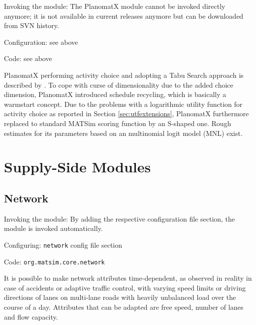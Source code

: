 
{\color{lightgray}\tiny

\begin{compactitem}
\item Invoking the module: The PlanomatX module cannot be invoked directly anymore; it is not available in current releases anymore but can be downloaded from SVN history.
\item Configuration: see above
\item Code: see above
\end{compactitem}

PlanomatX performing activity choice and adopting a Tabu Search approach is described by \citet[][]{Feil_PhDThesis_2010}. To cope with curse of dimensionality due to the added choice dimension, PlanomatX introduced schedule recycling, which is basically a warmstart concept. Due to the problems with a logarithmic utility function for activity choice as reported in Section \ref{sec:utfextensions}, PlanomatX furthermore replaced to standard MATSim scoring function by an S-shaped one. Rough estimates for its parameters based on an multinomial logit model (MNL) exist.
}

\section{Supply-Side Modules}
\label{sec:supplysidemodules}

\subsection{Network}
\label{sec:network}
\begin{compactitem}
\item Invoking the module: By adding the respective configuration file section, the module is invoked automatically.
\item Configuring: \lstinline|network| config file section
\item Code: \lstinline|org.matsim.core.network|
\end{compactitem}

It is possible to make network attributes time-dependent, as observed in reality in case of accidents or adaptive traffic control, with varying speed limits or driving directions of lanes on multi-lane roads with heavily unbalanced load over the course of a day. Attributes that can be adapted are free speed, number of lanes and flow capacity.

